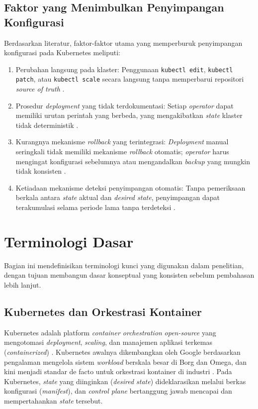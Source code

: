 \subsection{Faktor yang Menimbulkan Penyimpangan Konfigurasi}

Berdasarkan literatur, faktor-faktor utama yang memperburuk penyimpangan konfigurasi pada Kubernetes meliputi:

\begin{enumerate}
  \item Perubahan langsung pada klaster: Penggunaan \texttt{kubectl\allowbreak{} edit}, \texttt{kubectl\allowbreak{} patch}, atau \texttt{kubectl\allowbreak{} scale} secara langsung tanpa memperbarui repositori \textit{source of truth} \citep{zhang2026configuration}.
  
  \item Prosedur \textit{deployment} yang tidak terdokumentasi: Setiap \textit{operator} dapat memiliki urutan perintah yang berbeda, yang mengakibatkan \textit{state} klaster tidak deterministik \citep{rahman2020gang}.
  
  \item Kurangnya mekanisme \textit{rollback} yang terintegrasi: \textit{Deployment} manual seringkali tidak memiliki mekanisme \textit{rollback} otomatis; \textit{operator} harus mengingat konfigurasi sebelumnya atau mengandalkan \textit{backup} yang mungkin tidak konsisten \citep{rahman2023security, rahman2019seven}.
  
  \item Ketiadaan mekanisme deteksi penyimpangan otomatis: Tanpa pemeriksaan berkala antara \textit{state} aktual dan \textit{desired state}, penyimpangan dapat terakumulasi selama periode lama tanpa terdeteksi \citep{zhang2026configuration}.
\end{enumerate}

\section{Terminologi Dasar}

Bagian ini mendefinisikan terminologi kunci yang digunakan dalam penelitian, dengan tujuan membangun dasar konseptual yang konsisten sebelum pembahasan lebih lanjut.

\subsection{Kubernetes dan Orkestrasi Kontainer}
Kubernetes adalah platform \textit{container orchestration} \textit{open-source} yang mengotomasi \textit{deployment}, \textit{scaling}, dan manajemen aplikasi terkemas (\textit{containerized}) \citep{burns2016borg}. Kubernetes awalnya dikembangkan oleh Google berdasarkan pengalaman mengelola sistem \textit{workload} berskala besar di Borg dan Omega, dan kini menjadi standar de facto untuk orkestrasi kontainer di industri \citep{verma2015borg}. Pada Kubernetes, \textit{state} yang diinginkan (\textit{desired state}) dideklarasikan melalui berkas konfigurasi (\textit{manifest}), dan \textit{control plane} bertanggung jawab mencapai dan mempertahankan \textit{state} tersebut.

